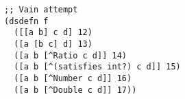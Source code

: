 \begin{lstlisting}[style=reclojureClojure,frame=single]
;; Vain attempt
(dsdefn f 
  ([[a b] c d] 12)
  ([a [b c] d] 13)
  ([a b [^Ratio c d]] 14)
  ([a b [^(satisfies int?) c d]] 15)
  ([a b [^Number c d]] 16)
  ([a b [^Double c d]] 17))
\end{lstlisting}
